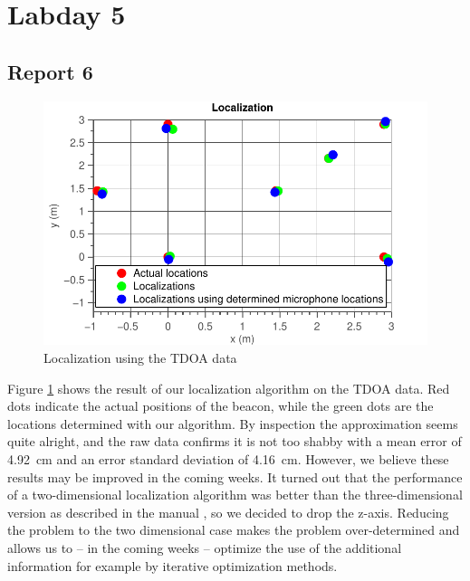 \documentclass[11pt,titlepage]{report}
\begin{document}
\section{Labday 5}
\subsection{Report 6}
\begin{figure}[H]
	\begin{center}
		\includegraphics[width=.8\linewidth]{../../deliverable-7-resources/figures/ass-2/report-6/ass-2-report-6.pdf}
	\end{center}
	\caption{Localization using the TDOA data}
	\label{fig:ass-2-rep-6}
\end{figure}
Figure \ref{fig:ass-2-rep-6} shows the result of our localization algorithm on the TDOA data. Red dots indicate the actual positions of the beacon, while the green dots are the locations determined with our algorithm. By inspection the approximation seems quite alright, and the raw data confirms it is not too shabby with a mean error of \SI{4.92}{\centi\meter} and an error standard deviation of \SI{4.16}{\centi\meter}. However, we believe these results may be improved in the coming weeks. It turned out that the performance of a two-dimensional localization algorithm was better than the three-dimensional version as described in the manual \cite{epo4-manual}, so we decided to drop the z-axis. Reducing the problem to the two dimensional case makes the problem over-determined and allows us to -- in the coming weeks -- optimize the use of the additional information for example by iterative optimization methods. 
\end{document}

